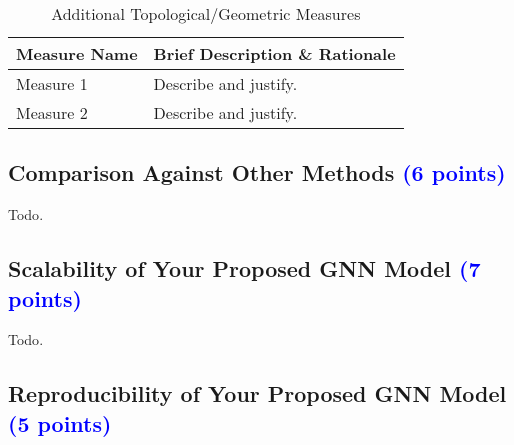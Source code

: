 \documentclass[conference]{IEEEtran}
\begin{document}
\begin{table}[ht!]
\renewcommand{\arraystretch}{1.3}
\centering
\caption{Additional Topological/Geometric Measures}
\begin{tabular}{|p{3cm}|p{4cm}|}
\hline
\textbf{Measure Name} & \textbf{Brief Description \& Rationale} \\
\hline
Measure 1 & Describe and justify. \\
\hline
Measure 2 & Describe and justify. \\
\hline
\end{tabular}
\label{tab:2Measures}
\end{table}



\subsection{Comparison Against Other Methods \textcolor{blue}{(6 points)}}

\textcolor{ashgrey}{Todo}.


\subsection{Scalability of Your Proposed GNN Model \textcolor{blue}{(7 points)}}

\textcolor{ashgrey}{Todo}.


\subsection{Reproducibility of Your Proposed GNN Model \textcolor{blue}{(5 points)}}
\end{document}

